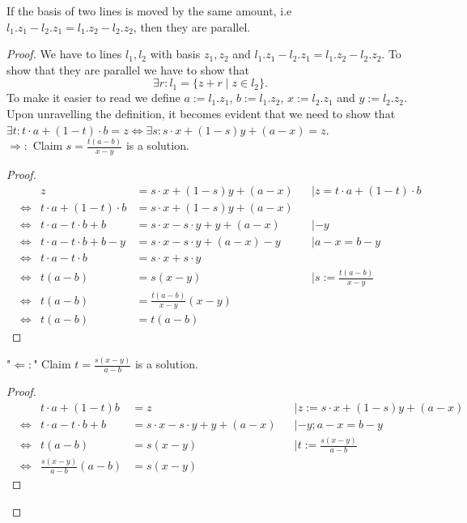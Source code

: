 \begin{lemma}
    \label{lem:parallel_by_basis}
    \leanok
   If the basis of two lines is moved by the same amount, i.e $l_1.z_1 - l_2.z_1 = l_1.z_2- l_2.z_2$, then they are parallel.
\end{lemma}
\begin{proof}
    \leanok
    We have to lines $l_1, l_2$ with basis $z_1, z_2$ and $l_1.z_1 - l_2.z_1 = l_1.z_2- l_2.z_2$. To show that they are parallel we have to show that $$\exists r: l_1 = \{z + r \mid z\in l_2\}.$$
    To make it easier to read we define $a := l_1.z_1$, $b:= l_1.z_2$, $x:= l_2.z_1$ and $y:= l_2.z_2$.\\
    Upon unravelling the definition, it becomes evident that we need to show that  $\exists t: t \cdot a +(1-t)\cdot b=z \iff \exists s :s \cdot x+(1-s)y+(a-x)=z$.\\
    $\Rightarrow:$ Claim $s = \frac{t(a-b)}{x-y}$ is a solution.\\
    \begin{proof}
    \begin{align*}
        && z &= s \cdot x+(1-s)y+(a-x)&&| z= t\cdot a+(1-t)\cdot b\\
        &\Leftrightarrow & t\cdot a+(1-t)\cdot b  &= s \cdot x+(1-s)y+(a-x)\\
        &\Leftrightarrow & t\cdot a-t\cdot b +b &= s \cdot x-s\cdot y + y+(a-x)&& | -y\\
        &\Leftrightarrow & t\cdot a-t\cdot b + b-y  &= s \cdot x-s\cdot y+(a-x)-y&&| a-x =b-y\\
        &\Leftrightarrow & t\cdot a-t\cdot b  &= s \cdot x+s\cdot y\\
        &\Leftrightarrow & t(a-b)  &= s(x-y)&&|s:= \frac{t(a-b)}{x-y}\\
        &\Leftrightarrow & t(a-b)  &= \frac{t(a-b)}{x-y}(x-y)\\
        &\Leftrightarrow & t(a-b)  &= t(a-b)
    \end{align*}
    \end{proof}
    "$\Leftarrow:$" Claim $t = \frac{s(x-y)}{a-b}$ is a solution.
    \begin{proof}
    \begin{align*}
        && t\cdot a+(1-t)b &= z&&| z:= s \cdot x+(1-s)y+(a-x)\\
        &\Leftrightarrow& t\cdot a-t\cdot b+b &= s \cdot x-s\cdot y+y+(a-x)&&|-y;a-x =b-y\\
        &\Leftrightarrow& t(a-b) &= s(x-y)&&|t:= \frac{s(x-y)}{a-b}\\
        &\Leftrightarrow& \frac{s(x-y)}{a-b}(a-b) &= s(x-y)
    \end{align*}
    \end{proof}
\end{proof}

